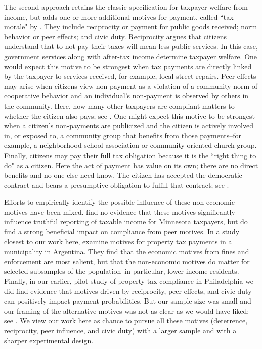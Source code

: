 \documentclass[12pt]{article}
\begin{document}
The second approach retains the classic specification for taxpayer
welfare from income, but adds one or more additional motives for
payment, called ``tax morale" by .  They include
reciprocity or payment for public goods received; norm behavior or
peer effects; and civic duty.  Reciprocity argues that citizens
understand that to not pay their taxes will mean less public services.
In this case, government services along with after-tax income
determine taxpayer welfare.  One would expect this motive to be
strongest when tax payments are directly linked by the taxpayer to
services received, for example, local street repairs.  Peer effects
may arise when citizens view non-payment as a violation of a community
norm of cooperative behavior and an individual's non-payment is
observed by others in the community.  Here, how many other taxpayers
are compliant matters to whether the citizen also pays; see
.  One might expect this motive to be strongest when
a citizen's non-payments are publicized and the citizen is actively
involved in, or exposed to, a community group that benefits from those
payments--for example, a neighborhood school association or community
oriented church group.  Finally, citizens may pay their full tax
obligation because it is the ``right thing to do" as a citizen.  Here
the act of payment has value on its own; there are no direct benefits
and no one else need know.  The citizen has accepted the democratic
contract and bears a presumptive obligation to fulfill that contract;
see .

Efforts to empirically identify the possible influence of these
non-economic motives have been mixed.   find no
evidence that these motives significantly influence truthful reporting
of taxable income for Minnesota taxpayers, but 
do find a strong beneficial impact on compliance from peer motives.
In a study closest to our work here,  examine motives
for property tax payments in a municipality in Argentina.  They find
that the economic motives from fines and enforcement are most salient,
but that the non-economic motives do matter for selected subsamples of
the population--in particular, lower-income residents.  Finally, in
our earlier, pilot study of property tax compliance in Philadelphia we
did find evidence that motives driven by reciprocity, peer effects,
and civic duty can positively impact payment probabilities. But our
sample size was small and our framing of the alternative motives was
not as clear as we would have liked; see .  We view
our work here as chance to pursue all these motives (deterrence,
reciprocity, peer influence, and civic duty) with a larger sample and
with a sharper experimental design.
\end{document}
